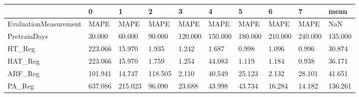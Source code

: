 \begin{tabular}{llllllllll}
\toprule
{} &       0 &       1 &       2 &       3 &       4 &       5 &       6 &       7 &    mean \\
\midrule
EvaluationMeasurement &    MAPE &    MAPE &    MAPE &    MAPE &    MAPE &    MAPE &    MAPE &    MAPE &     NaN \\
PretrainDays          &  30.000 &  60.000 &  90.000 & 120.000 & 150.000 & 180.000 & 210.000 & 240.000 & 135.000 \\
HT\_Reg                & 223.066 &  15.970 &   1.935 &   1.242 &   1.687 &   0.998 &   1.096 &   0.996 &  30.874 \\
HAT\_Reg               & 223.066 &  15.970 &   1.759 &   1.254 &  44.083 &   1.119 &   1.184 &   0.938 &  36.171 \\
ARF\_Reg               & 101.941 &  14.747 & 118.505 &   2.110 &  40.549 &  25.123 &   2.132 &  28.101 &  41.651 \\
PA\_Reg                & 637.086 & 215.023 &  96.090 &  23.688 &  43.998 &  43.734 &  16.284 &  14.182 & 136.261 \\
\bottomrule
\end{tabular}
